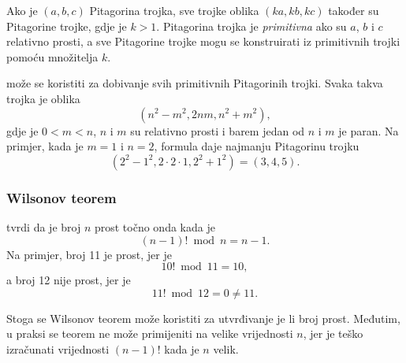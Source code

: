 Ako je $(a,b,c)$ Pitagorina trojka,
sve trojke oblika $(ka,kb,kc)$
također su Pitagorine trojke, gdje je $k>1$.
Pitagorina trojka je \emph{primitivna} ako su
$a$, $b$ i $c$ relativno prosti,
a sve Pitagorine trojke mogu se konstruirati
iz primitivnih trojki pomoću množitelja $k$.

 može se koristiti za dobivanje
svih primitivnih Pitagorinih trojki.
Svaka takva trojka je oblika
\[(n^2-m^2,2nm,n^2+m^2),\]
gdje je $0<m<n$, $n$ i $m$ su relativno prosti
i barem jedan od $n$ i $m$ je paran.
Na primjer, kada je $m=1$ i $n=2$, formula
daje najmanju Pitagorinu trojku
\[(2^2-1^2,2\cdot2\cdot1,2^2+1^2)=(3,4,5).\]

\subsubsection{Wilsonov teorem}


tvrdi da je broj $n$
prost točno onda kada je
\[(n-1)! \bmod n = n-1.\]
Na primjer, broj 11 je prost, jer je
\[10! \bmod 11 = 10,\]
a broj 12 nije prost, jer je
\[11! \bmod 12 = 0 \neq 11.\]

Stoga se Wilsonov teorem može koristiti za utvrđivanje
je li broj prost. Međutim, u praksi se teorem ne može
primijeniti na velike vrijednosti $n$, jer je teško
izračunati vrijednosti $(n-1)!$ kada je $n$ velik.


